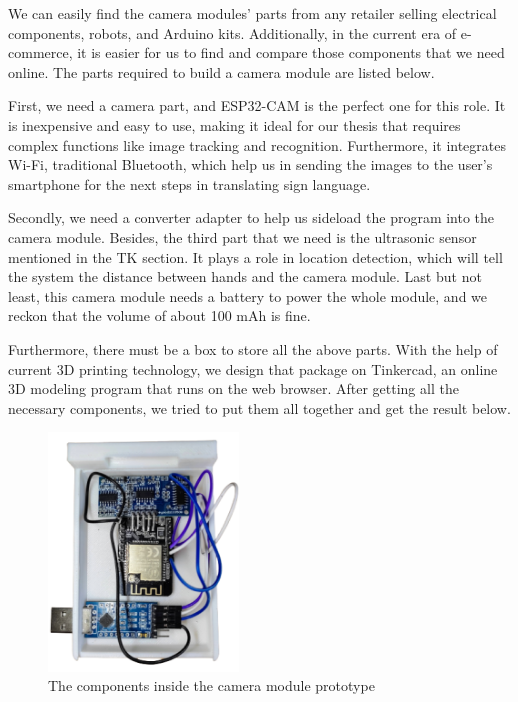 We can easily find the camera modules' parts from any retailer selling electrical components, robots, and Arduino kits. Additionally, in the current era of e-commerce, it is easier for us to find and compare those components that we need online. The parts required to build a camera module are listed below.

First, we need a camera part, and ESP32-CAM is the perfect one for this role. It is inexpensive and easy to use, making it ideal for our thesis that requires complex functions like image tracking and recognition. Furthermore, it integrates Wi-Fi, traditional Bluetooth, which help us in sending the images to the user's smartphone for the next steps in translating sign language.

Secondly, we need a converter adapter to help us sideload the program into the camera module. Besides, the third part that we need is the ultrasonic sensor mentioned in the TK section. It plays a role in location detection, which will tell the system the distance between hands and the camera module. Last but not least, this camera module needs a battery to power the whole module, and we reckon that the volume of about 100 mAh is fine.

Furthermore, there must be a box to store all the above parts. With the help of current 3D printing technology, we design that package on Tinkercad, an online 3D modeling program that runs on the web browser. After getting all the necessary components, we tried to put them all together and get the result below.

\begin{figure}[H]
	\centering
	\includegraphics[width=0.45\textwidth]{img/Chap5/Prototype_View_inside.png}
	\caption{The components inside the camera module prototype}
\end{figure}

